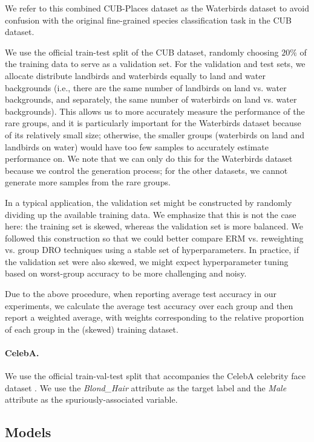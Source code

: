 We refer to this combined CUB-Places dataset as the Waterbirds dataset
to avoid confusion with the original fine-grained species classification task in the CUB dataset.

We use the official train-test split of the CUB dataset,
randomly choosing $20\%$ of the training data to serve as a validation set.
For the validation and test sets, we allocate distribute landbirds and waterbirds equally to land and water backgrounds (i.e., there are the same number of landbirds on land vs. water backgrounds,
and separately, the same number of waterbirds on land vs. water backgrounds).
This allows us to more accurately measure the performance of the rare groups,
and it is particularly important for the Waterbirds dataset because of its relatively small size;
otherwise, the smaller groups (waterbirds on land and landbirds on water) would have too few samples to
accurately estimate performance on.
We note that we can only do this for the Waterbirds dataset because we control the generation process;
for the other datasets, we cannot generate more samples from the rare groups.

In a typical application, the validation set might be constructed by randomly dividing up the available training data. We emphasize that this is not the case here: the training set is skewed, whereas the validation set is more balanced. We followed this construction so that we could better compare ERM vs. reweighting vs. group DRO techniques using a stable set of hyperparameters. In practice, if the validation set were also skewed, we might expect hyperparameter tuning based on worst-group accuracy to be more challenging and noisy.

Due to the above procedure,
when reporting average test accuracy in our experiments,
we calculate the average test accuracy over each group and then report a
weighted average, with weights corresponding to the relative proportion of each group in the
(skewed) training dataset.

\paragraph{CelebA.}
We use the official train-val-test split that accompanies the CelebA celebrity face dataset \citep{liu2015deep}. We use the \emph{Blond\_Hair} attribute as the target label and the \emph{Male}
attribute as the spuriously-associated variable.

\subsection{Models}\label{sec:model_details}

